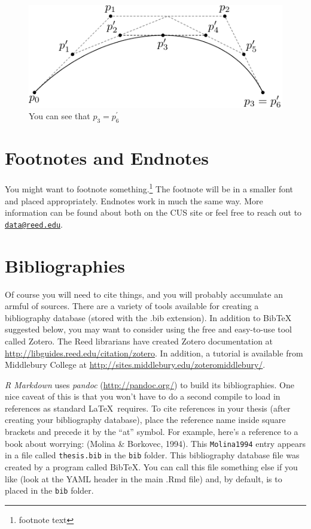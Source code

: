 \documentclass[12pt,twoside]{reedthesis}
\begin{document}
  \begin{figure}[h!tbp]
  \centering
  \includegraphics[angle = 0,scale = 1]{figure/subdivision.pdf}
  \caption[Subdivision of arc segments]{\footnotesize{You can see that $p_3 = p_6^\prime$}}
  \label{fig:subd3}
  \end{figure}
  
  \section{Footnotes and Endnotes}\label{footnotes-and-endnotes-1}
  
  You might want to footnote something.\footnote{footnote text} The
  footnote will be in a smaller font and placed appropriately. Endnotes
  work in much the same way. More information can be found about both on
  the CUS site or feel free to reach out to
  \href{mailto:data@reed.edu}{\nolinkurl{data@reed.edu}}.
  
  \section{Bibliographies}\label{bibliographies-1}
  
  Of course you will need to cite things, and you will probably accumulate
  an armful of sources. There are a variety of tools available for
  creating a bibliography database (stored with the .bib extension). In
  addition to BibTeX suggested below, you may want to consider using the
  free and easy-to-use tool called Zotero. The Reed librarians have
  created Zotero documentation at
  \url{http://libguides.reed.edu/citation/zotero}. In addition, a tutorial
  is available from Middlebury College at
  \url{http://sites.middlebury.edu/zoteromiddlebury/}.
  
  \emph{R Markdown} uses \emph{pandoc} (\url{http://pandoc.org/}) to build
  its bibliographies. One nice caveat of this is that you won't have to do
  a second compile to load in references as standard \LaTeX~requires. To
  cite references in your thesis (after creating your bibliography
  database), place the reference name inside square brackets and precede
  it by the ``at'' symbol. For example, here's a reference to a book about
  worrying: (Molina \& Borkovec, 1994). This \texttt{Molina1994} entry
  appears in a file called \texttt{thesis.bib} in the \texttt{bib} folder.
  This bibliography database file was created by a program called BibTeX.
  You can call this file something else if you like (look at the YAML
  header in the main .Rmd file) and, by default, is to placed in the
  \texttt{bib} folder.
  
\end{document}

